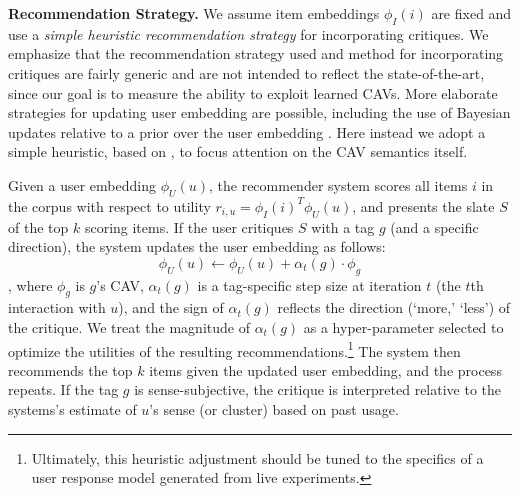 \documentclass[manuscript,screen,nonacm]{acmart}
\newcommand{\1}{{\mathbf 1}}
\theoremstyle{TheoremNum}
\begin{document}
\vskip 2mm
\noindent
\textbf{Recommendation Strategy.} \hspace*{2mm}
We assume item embeddings $\phi_I(i)$ are fixed and use a \emph{simple heuristic recommendation strategy} for incorporating critiques. We emphasize that the recommendation strategy used and method for incorporating critiques are fairly generic and are not intended to reflect the state-of-the-art, since our goal is to measure the ability to exploit learned CAVs. More elaborate strategies for updating user embedding are possible, including the use of Bayesian updates relative to a prior over the user embedding \cite{vendrov2020gradient}. Here instead we adopt a simple heuristic, based on \cite{luo2020latent}, to focus attention on the CAV semantics itself.

Given a user embedding $\phi_U(u)$, the recommender system scores all items $i$ in the corpus with respect to utility $r_{i,u} = \phi_I(i)^T\phi_U(u)$, and presents the slate $S$ of the top $k$ scoring items. 
If the user critiques $S$ with a tag $g$ (and a specific direction), the system updates the user embedding as follows:
$$\phi_U(u) \leftarrow \phi_U(u) + \alpha_t(g) \cdot \phi_g$$, where $\phi_g$ is $g$'s CAV, $\alpha_t(g)$ is a tag-specific step size at iteration $t$ (the $t$th interaction with $u$), and the sign of $\alpha_t(g)$ reflects the direction (`more,' `less') of the critique. We treat the magnitude of $\alpha_t(g)$ as a hyper-parameter selected to optimize the utilities of the resulting recommendations.\footnote{Ultimately, this heuristic adjustment should be tuned to the specifics of a user response model generated from live experiments.} The system then recommends the top $k$ items given the updated user embedding, and the process repeats. If the tag $g$ is sense-subjective, the critique is interpreted relative to the systems's estimate of $u$'s sense (or cluster) based on past usage.
\end{document}

